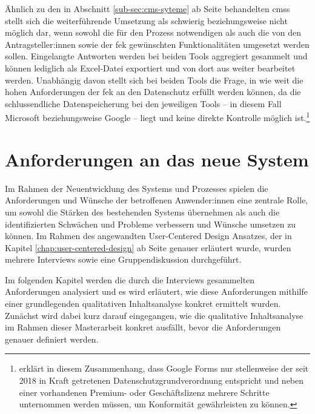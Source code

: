 \documentclass[a4paper,12pt,twoside]{scrreprt}
\begin{document}
Ähnlich zu den in Abschnitt \ref{sub-sec:cms-syteme} ab Seite \pageref{sub-sec:cms-syteme} behandelten \aclp{cms} stellt sich die weiterführende Umsetzung als schwierig beziehungsweise nicht möglich dar, wenn sowohl die für den Prozess notwendigen als auch die von den Antragsteller:innen sowie der \ac{fek} gewünschten Funktionalitäten umgesetzt werden sollen. Eingelangte Antworten werden bei beiden Tools aggregiert gesammelt und können lediglich als Excel-Datei exportiert und von dort aus weiter bearbeitet werden. \cite{microsoft_corporation_wie_2021, google_ireland_limited_ergebnisse_2023} Unabhängig davon stellt sich bei beiden Tools die Frage, in wie weit die hohen Anforderungen der \acl{fek} an den Datenschutz erfüllt werden können, da die schlussendliche Datenspeicherung bei den jeweiligen Tools -- in diesem Fall Microsoft beziehungsweise Google -- liegt und keine direkte Kontrolle möglich ist.\footnote{\cite{visitor_analytics_gmbh_ist_2022} erklärt in diesem Zusammenhang, dass Google Forms nur stellenweise der seit 2018 in Kraft getretenen Datenschutzgrundverordnung entspricht und neben einer vorhandenen Premium- oder Geschäftslizenz mehrere Schritte unternommen werden müssen, um Konformität gewährleisten zu können.}

\cleardoublepage
\chapter{Anforderungen an das neue System}
\label{chap:anforderung-neues-system}

Im Rahmen der Neuentwicklung des Systems und Prozesses spielen die Anforderungen und Wünsche der betroffenen Anwender:innen eine zentrale Rolle, um sowohl die Stärken des bestehenden Systems übernehmen als auch die identifizierten Schwächen und Probleme verbessern und Wünsche umsetzen zu können. Im Rahmen des angewandten User-Centered Design Ansatzes, der in Kapitel \ref{chap:user-centered-design} ab Seite \pageref{chap:user-centered-design} genauer erläutert wurde, wurden mehrere Interviews sowie eine Gruppendiskussion durchgeführt.

Im folgenden Kapitel werden die durch die Interviews gesammelten Anforderungen analysiert und es wird erläutert, wie diese Anforderungen mithilfe einer grundlegenden qualitativen Inhaltsanalyse konkret ermittelt wurden. Zunächst wird dabei kurz darauf eingegangen, wie die qualitative Inhaltsanalyse im Rahmen dieser Masterarbeit konkret ausfällt, bevor die Anforderungen genauer definiert werden.
\end{document}
